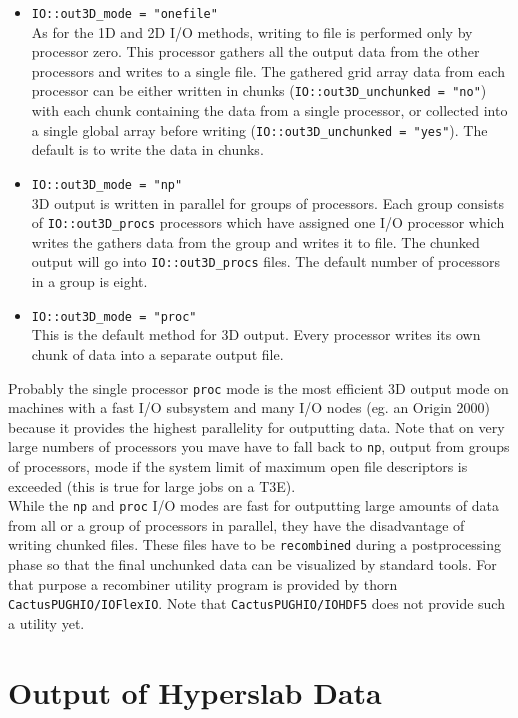\documentclass{article}
\begin{document}
\begin{itemize}
  \item {\tt IO::out3D\_mode = "onefile"}\\
    As for the 1D and 2D I/O methods, writing to file is performed only 
    by processor zero.
    This processor gathers all the output data from the other processors
    and writes to a single file. The gathered grid array data from each
    processor can be either
    written in chunks ({\tt IO::out3D\_unchunked = "no"}) with each chunk
    containing the data from a single processor, or collected into a
    single global array before writing ({\tt IO::out3D\_unchunked = "yes"}).
    The default is to write the data in chunks.
  \item {\tt IO::out3D\_mode = "np"}\\
    3D output is written in parallel for groups of processors. Each group
    consists of {\tt IO::out3D\_procs} processors which have assigned one
    I/O processor which writes the gathers data from the group and writes it
    to file. The chunked output will go into {\tt IO::out3D\_procs} files. 
    The default number of processors in a group is eight.
  \item {\tt IO::out3D\_mode = "proc"}\\
    This is the default method for 3D output.
    Every processor writes its own chunk of data into a separate output file.
\end{itemize}

Probably the single processor {\tt proc} mode is the most efficient 3D output mode on 
machines with a fast I/O subsystem and many I/O nodes (eg. an Origin 2000) 
because it provides the highest
parallelity for outputting data. Note that on very large numbers of processors
you mave have to fall back to {\tt np}, output from groups of processors, 
mode if the system limit of
maximum open file descriptors is exceeded (this is true for large jobs on a
 T3E).\\
While the {\tt np} and {\tt proc} I/O modes are fast for outputting large
amounts of data from all or a group of processors in parallel, they have
the disadvantage of writing chunked files. These files have to be 
{\tt recombined}
during a postprocessing phase so that the final unchunked data can be
visualized by standard tools. For that purpose a recombiner utility program is
provided by thorn {\tt CactusPUGHIO/IOFlexIO}.
Note that {\tt CactusPUGHIO/IOHDF5} does not provide such a utility yet. 

\section{Output of Hyperslab Data}
\end{document}
